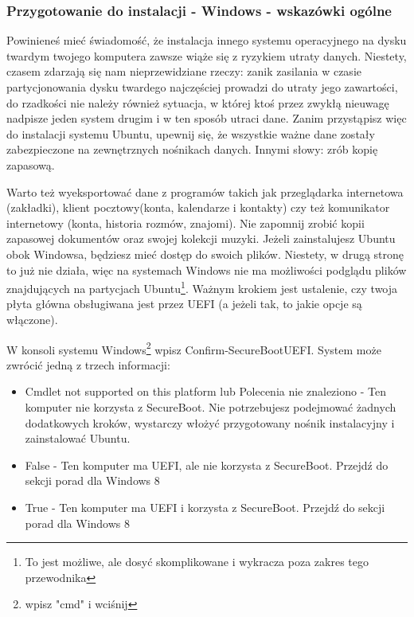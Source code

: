\subsubsection{Przygotowanie do instalacji - Windows - wskazówki ogólne}
\label{sec:przygotowanie_windows}
Powinieneś mieć świadomość, że instalacja innego systemu operacyjnego na dysku twardym twojego komputera zawsze wiąże się z ryzykiem utraty danych. Niestety, czasem zdarzają się nam nieprzewidziane rzeczy: zanik zasilania w czasie partycjonowania dysku twardego najczęściej prowadzi do utraty jego zawartości, do rzadkości nie należy również sytuacja, w której ktoś przez zwykłą nieuwagę  nadpisze jeden system drugim i w ten sposób utraci dane. Zanim przystąpisz więc do instalacji systemu Ubuntu, upewnij się, że wszystkie ważne dane zostały zabezpieczone na zewnętrznych nośnikach danych. Innymi słowy: zrób kopię zapasową.

Warto też wyeksportować dane z programów takich jak przeglądarka internetowa (zakładki), klient pocztowy(konta, kalendarze i kontakty) czy też komunikator internetowy (konta, historia rozmów, znajomi). Nie zapomnij zrobić kopii zapasowej dokumentów oraz swojej kolekcji muzyki. Jeżeli zainstalujesz Ubuntu obok Windowsa, będziesz mieć dostęp do swoich plików. Niestety, w drugą stronę to już nie działa, więc na systemach Windows nie ma możliwości podglądu plików znajdujących na partycjach Ubuntu\footnote{To jest możliwe, ale dosyć skomplikowane i wykracza poza zakres tego przewodnika}.
Ważnym krokiem jest ustalenie, czy twoja płyta główna obsługiwana jest przez UEFI (a jeżeli tak, to jakie opcje są włączone).

W konsoli systemu Windows\footnote{ wpisz "cmd" i wciśnij \keys{\returnwin} } wpisz \textcolor{ubuntu_orange}{Confirm-SecureBootUEFI}. System może zwrócić jedną z trzech informacji:
\begin{itemize}
\item \textcolor{ubuntu_orange}{Cmdlet not supported on this platform} lub \textcolor{ubuntu_orange}{Polecenia nie znaleziono} - Ten komputer nie korzysta z SecureBoot. Nie potrzebujesz podejmować żadnych dodatkowych kroków, wystarczy włożyć przygotowany nośnik instalacyjny i zainstalować Ubuntu.
\item \textcolor{ubuntu_orange}{False} - Ten komputer ma UEFI, ale nie korzysta z SecureBoot. Przejdź do sekcji porad dla Windows 8
\item \textcolor{ubuntu_orange}{True} - Ten komputer ma UEFI i korzysta z SecureBoot. Przejdź do sekcji porad dla Windows 8
\end{itemize}
